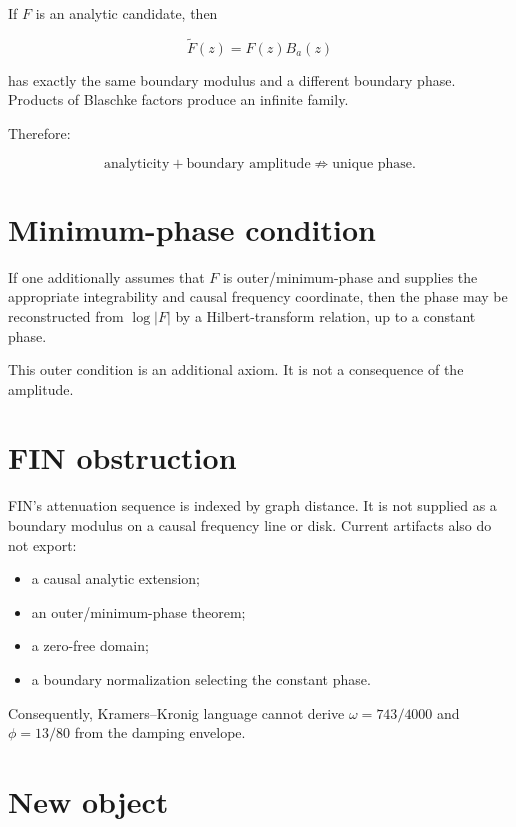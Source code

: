 \documentclass[11pt,a4paper,openany]{report}
\begin{document}
If \(F\) is an analytic candidate, then

\[
\widetilde F(z)=F(z)B_a(z)
\]

has exactly the same boundary modulus and a different boundary phase. Products of Blaschke factors produce an infinite family.

Therefore:

\[
\text{analyticity}+\text{boundary amplitude}
\not\Rightarrow
\text{unique phase}.
\]

\section{Minimum-phase condition}

If one additionally assumes that \(F\) is outer/\allowbreak{}minimum-phase and supplies the appropriate integrability and causal frequency coordinate, then the phase may be reconstructed from \(\log|F|\) by a Hilbert-transform relation, up to a constant phase.

This outer condition is an additional axiom. It is not a consequence of the amplitude.

\section{FIN obstruction}

FIN's attenuation sequence is indexed by graph distance. It is not supplied as a boundary modulus on a causal frequency line or disk. Current artifacts also do not export:

\begin{itemize}
\item 
a causal analytic extension;

\item 
an outer/\allowbreak{}minimum-phase theorem;

\item 
a zero-free domain;

\item 
a boundary normalization selecting the constant phase.

\end{itemize}

Consequently, Kramers--Kronig language cannot derive \(\omega=743/4000\) and \(\phi=13/80\) from the damping envelope.

\section{New object}
\end{document}
